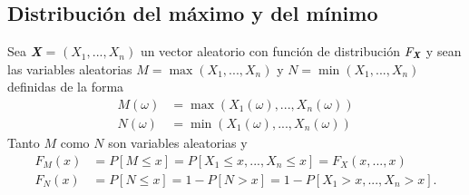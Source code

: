 \subsection{Distribución del máximo y del mínimo}

Sea \textit{\textbf{X}} = $(X_1,...,X_n)$ un vector aleatorio con función de distribución $F_{\textit{\textbf{X}}}$ y sean las variables aleatorias $M = \max(X_1,...,X_n)$ y $N = \min(X_1,...,X_n)$ definidas de la forma
\begin{align*}
    M(\omega) &= \max(X_1(\omega),...,X_n(\omega))\\
    N(\omega) &= \min(X_1(\omega),...,X_n(\omega))
\end{align*}
Tanto $M$ como $N$ son variables aleatorias y
\begin{align*}
    F_M(x) &= P[M \leq x] = P[X_1 \leq x,..., X_n \leq x] = F_X(x,...,x)\\
    F_N(x) &= P[N \leq x] = 1 - P[N > x] = 1 - P[X_1 > x,...,X_n > x].
\end{align*}
